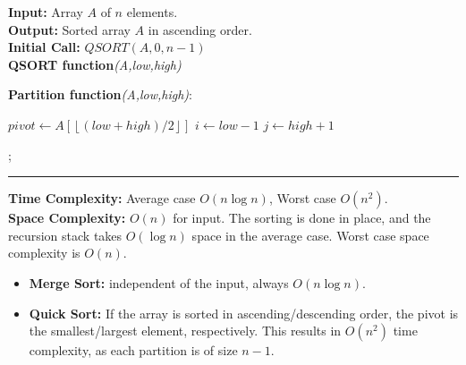 \begin{Func}
    \textbf{Input:} Array $A$ of $n$ elements.\\
    \textbf{Output:} Sorted array $A$ in ascending order.\\
    \textbf{Initial Call:} $QSORT(A, 0, n-1)$\\

    \vspace{-.5em}
    \noindent
    \textbf{QSORT function}\textit{(A,low,high)}\\
    \begin{algorithm}[H]
        \label{algo:quicksort}
    \end{algorithm}

    \vspace{.5em}

    \noindent
    \textbf{Partition function}\textit{(A,low,high)}:\\
    \begin{algorithm}[H]
        $pivot \gets A[\left\lfloor (low + high)/2 \right\rfloor]$\;
        $i \gets low - 1$\;
        $j \gets high + 1$\;
        
        ; 
    \end{algorithm}

    \noindent\rule{\textwidth}{0.4pt}

    \noindent
    \textbf{Time Complexity:} Average case $O(n \log n)$, Worst case $O(n^2)$.\\
    \textbf{Space Complexity:} $O(n)$ for input. The sorting is done in place, and the recursion stack takes $O(\log n)$ space in the average case. Worst case space complexity is $O(n)$.
\end{Func}


\vspace{-1em}
\begin{theo}

    \begin{itemize}
        \item \textbf{Merge Sort:} independent of the input, always $O(n \log n)$.
        \vspace{-.5em}
        \item \textbf{Quick Sort:} If the array is sorted in ascending/descending order, the pivot is the smallest/largest element, respectively. This results in $O(n^2)$ time complexity, as each partition is of size $n-1$.
    \end{itemize}
\end{theo}

